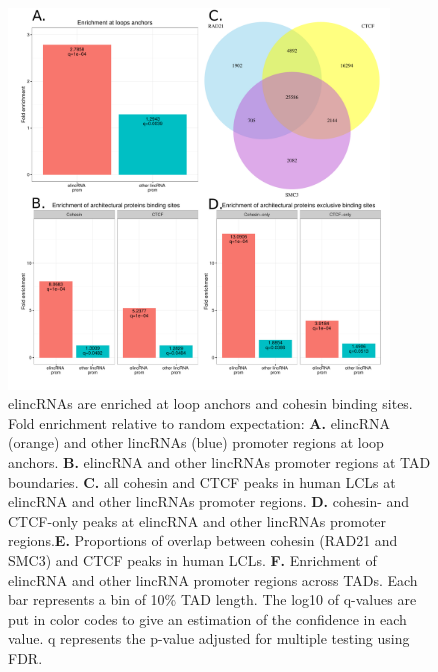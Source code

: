 \documentclass[11pt,a4paper]{report}
\begin{document}
\begin{figure}[ht]
	\includegraphics[width=0.9\textwidth]{Figures/2_enrich_anchor_prot.pdf}
	\caption{elincRNAs are enriched at loop anchors and cohesin binding sites. Fold enrichment relative to random expectation: \textbf{A.} elincRNA (orange) and other lincRNAs (blue) promoter regions at loop anchors. \textbf{B.} elincRNA and other lincRNAs promoter regions at TAD boundaries. \textbf{C.} all cohesin and CTCF peaks in human LCLs at elincRNA and other lincRNAs promoter regions. \textbf{D.} cohesin- and CTCF-only peaks at elincRNA and other lincRNAs promoter regions.\textbf{E.} Proportions of overlap between cohesin (RAD21 and SMC3) and CTCF peaks in human LCLs. \textbf{F.} Enrichment of elincRNA and other lincRNA promoter regions across TADs. Each bar represents a bin of 10\% TAD length. The log10 of q-values are put in color codes to give an estimation of the confidence in each value. q represents the p-value adjusted for multiple testing using FDR.}
	\label{enrich_elinc}
\end{figure}
\end{document}

